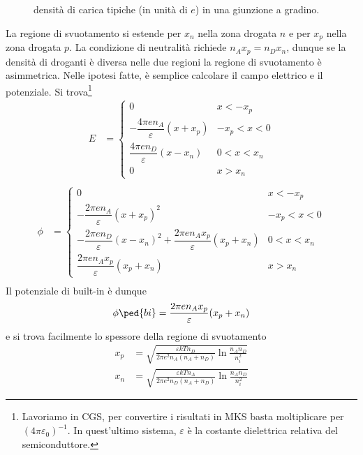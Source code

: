 \documentclass[a4paper, 11pt]{article}
\begin{document}
	\begin{figure}[h!]
		\centering
		\caption{densità di carica tipiche (in unità di $e$) in una giunzione a gradino.}
		\label{fig:densita}
	\end{figure}
	La regione di svuotamento si estende per $x_n$ nella zona drogata $n$ e per $x_p$ nella zona drogata $p$. La condizione di neutralità richiede  $n_Ax_p=n_Dx_n$, dunque se la densità di droganti è diversa nelle due regioni la regione di svuotamento è asimmetrica. Nelle ipotesi fatte, è semplice calcolare il campo elettrico e il potenziale. Si trova\footnote{Lavoriamo in CGS, per convertire i risultati in MKS basta moltiplicare per $(4\pi\varepsilon_0)^{-1}$. In quest'ultimo sistema, $\varepsilon$ è la costante dielettrica relativa del semiconduttore.}
	\begin{align*}
		E&=\begin{cases}
		0&x<-x_p\\
		-\dfrac{4\pi en_A}{\varepsilon}(x+x_p)&-x_p<x<0\\
		\dfrac{4\pi en_D}{\varepsilon}(x-x_n)&0<x<x_n\\
		0&x>x_n
		\end{cases}\\
	\end{align*}
	\begin{align*}
	\phi&=\begin{cases}
	0&x<-x_p\\
	-\dfrac{2\pi en_A}{\varepsilon}(x+x_p)^2&-x_p<x<0\\
	-\dfrac{2\pi en_D}{\varepsilon}(x-x_n)^2+\dfrac{2\pi en_Ax_p}{\varepsilon}(x_p+x_n)&0<x<x_n\\
	\dfrac{2\pi en_Ax_p}{\varepsilon}(x_p+x_n)&x>x_n
	\end{cases}\\
	\end{align*}
	Il potenziale di built-in è dunque
	\[\phi\ped{bi}=\frac{2\pi en_Ax_p}{\varepsilon}(x_p+x_n)\]
	e si trova facilmente lo spessore della regione di svuotamento
	\begin{align*}
		x_p&=\sqrt{\frac{\varepsilon kT n_D}{2\pi e^2n_A(n_A+n_D)}\ln\frac{n_An_D}{n_i^2}}\\
		x_n&=\sqrt{\frac{\varepsilon kT n_A}{2\pi e^2n_D(n_A+n_D)}\ln\frac{n_An_D}{n_i^2}}
	\end{align*}
	
\end{document}
